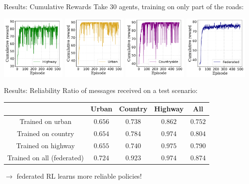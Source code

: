 \documentclass[aspectratio=169,12pt]{beamer}
\begin{document}
\begin{frame}{Results: Cumulative Rewards}
  Take $30$ agents, training on only part of the roads:

  \includegraphics[width = 0.24\textwidth]{images/baseline_highway.pdf}
  \includegraphics[width = 0.24\textwidth]{images/baseline_urban.pdf}
  \includegraphics[width = 0.24\textwidth]{images/baseline_ctr.pdf}
  \includegraphics[width = 0.24\textwidth]{images/learning_curve_federated_new.pdf}  
\end{frame}

\begin{frame}{Results: Reliability}
  Ratio of messages received on a test scenario:
  \begin{table}[t]
    \centering
    \begin{tabular*}{\textwidth}{@{\extracolsep{\fill}} ccccc }
      \toprule
      \textbf{} & \textbf{Urban} & \textbf{Country} & \textbf{Highway} & \textbf{All} \\
      \midrule
      Trained on urban & $0.656$ & $0.738$ & $0.862$ & $0.752$ \\
      Trained on country & $0.654$ & $0.784$ & $0.974$ & $0.804$  \\
      Trained on highway & $0.655$ & $0.740$ & $\mathbf{0.975}$ &  $0.790$\\
      Trained on all (federated) & $\mathbf{0.724}$ & $\mathbf{0.923}$ & $0.974$ & $\mathbf{0.874}$ \\
      \bottomrule
    \end{tabular*}
  \end{table}


  \textcolor{beamer@blendedblue}{
    $\rightarrow$ federated RL learns more reliable policies!
  }
\end{frame}
\end{document}
